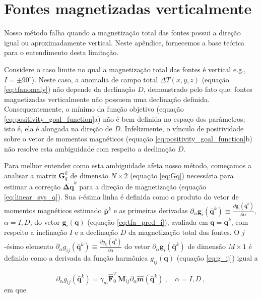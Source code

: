 \chapter{Fontes magnetizadas verticalmente}
\label{append:vertical-magnetization}

Nosso método falha quando a magnetização total das fontes possui a direção igual ou aproximadamente vertical. Neste apêndice, fornecemos a base teórica para o entendimento desta limitação. 

Considere o caso limite no qual a magnetização total das fontes é vertical e.g., $I = \pm 90^\circ$). Neste caso, a anomalia de campo total $\Delta T(x, y, z)$ (equação \ref{eq:tfanomaly}) não depende da declinação $D$, demonstrado pelo fato que: fontes magnetizadas verticalmente não possuem uma declinação definida. Consequentemente, o mínimo da função objetivo (equação \ref{eq:positivity_goal_function}a) não é bem definida no espaço dos parâmetros; isto é, ela é alongada na direção de $D$. Infelizmente, o vínculo de positividade sobre o vetor de momentos magnéticos (equação  \ref{eq:positivity_goal_function}b) não resolve esta ambiguidade com respeito a declinação $D$. 

Para melhor entender como esta ambiguidade afeta nosso método, começamos a analisar a matriz $\mathbf{G}_{q}^{k}$ de dimensão $N \times 2$ (equação \ref{eq:Gq}) necessária para estimar a correção $\bar{\mathbf{\Delta q}}^{k}$ para a direção de magnetização (equação \ref{eq:linear_sys_q}). Sua $i$-ésima linha é definida como o produto do vetor de momentos magnéticos estimado $\bar{\mathbf{p}}^{k}$ e as primeiras derivadas $\partial_{\alpha} \mathbf{g}_{i}(\bar{\mathbf{q}}^{k}) \equiv 
\frac{\partial \mathbf{g}_{i}(\bar{\mathbf{q}}^{k})}{\partial \alpha}$, $\alpha= I, D$, do vetor $\mathbf{g}_{i}(\mathbf{q})$ (equação \ref{eq:tfa_pred_i}), avaliada em $\mathbf{q} = \bar{\mathbf{q}}^{k}$, com respeito a inclinação $I$ e a declinação $D$ da magnetização total das fontes. O $j$-ésimo elemento $\partial_{\alpha} g_{ij}(\bar{\mathbf{q}}^{k}) \equiv 
\frac{\partial g_{ij}(\bar{\mathbf{q}}^{k})}{\partial \alpha}$ do vetor $\partial_{\alpha} \mathbf{g}_{i}(\bar{\mathbf{q}}^{k})$ de dimensão $M \times 1$ é definido como a derivada da função harmônica $g_{ij}(\mathbf{q})$ (equação \ref{eq:g_ij}) igual a 

\begin{equation}
\partial_{\alpha} g_{ij}(\bar{\mathbf{q}}^{k}) = 
\gamma_m  \hat{\mathbf{F}}_{0}^T \, \mathbf{M}_{ij} 
\partial_{\alpha} \hat{\mathbf{m}}(\bar{\mathbf{q}}^{k}) \: , \quad \alpha = I, D \: ,
\label{eq:D-alpha-gij}
\end{equation}
em que 

